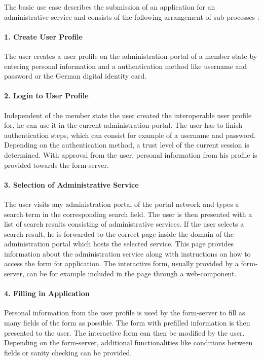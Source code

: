 The basic use case describes the submission of an application for an administrative service and consists of the following arrangement of sub-processes \cite{NRW:Umsetzung}:

\paragraph{1. Create User Profile}
The user creates a user profile on the administration portal of a member state by entering personal information and a authentication method like username and password or the German digital identity card.

\paragraph{2. Login to User Profile}
Independent of the member state the user created the interoperable user profile for, he can use it in the current administration portal. The user has to finish authentication steps, which can consist for example of a username and password. Depending on the authentication method, a trust level of the current session is determined. With approval from the user, personal information from his profile is provided towards the form-server.

\paragraph{3. Selection of Administrative Service}
The user visits any administration portal of the portal network and types a search term in the corresponding search field. The user is then presented with a list of search results consisting of administrative services. If the user selects a search result, he is forwarded to the correct page inside the domain of the administration portal which hosts the selected service. This page provides information about the administration service along with instructions on how to access the form for application. The interactive form, usually provided by a form-server, can be for example included in the page through a web-component.

\paragraph{4. Filling in Application}
Personal information from the user profile is used by the form-server to fill as many fields of the form as possible. The form with prefilled information is then presented to the user. The interactive form can then be modified by the user. Depending on the form-server, additional functionalities like conditions between fields or sanity checking can be provided.

